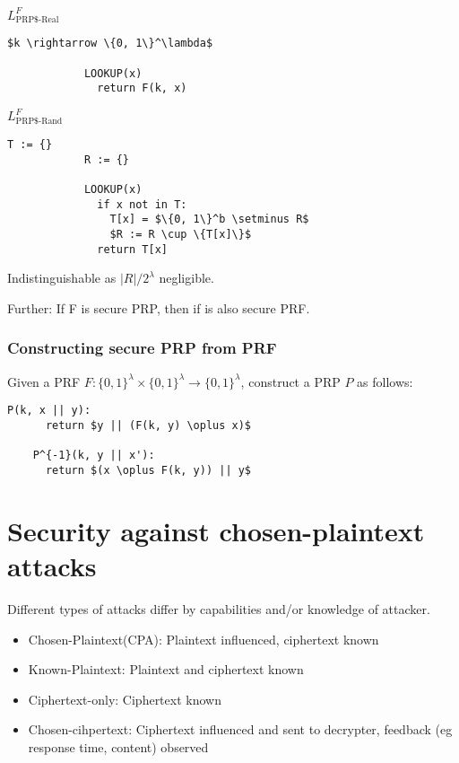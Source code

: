 \documentclass[a4paper]{scrreprt}
\begin{document}
\begin{tcbraster}[raster columns=2,raster equal height,nobeforeafter,raster column skip=2cm]
	\begin{library}{$L^F_{\text{PRP\$-Real}}$}
		\begin{lstlisting}[mathescape=true,autogobble=true]
			$k \rightarrow \{0, 1\}^\lambda$

			LOOKUP(x)
			  return F(k, x)
		\end{lstlisting}
	\end{library}
	\begin{library}{$L^F_{\text{PRP\$-Rand}}$}
		\begin{lstlisting}[mathescape=true,autogobble=true]
			T := {}
			R := {}

			LOOKUP(x)
			  if x not in T:
			    T[x] = $\{0, 1\}^b \setminus R$
			    $R := R \cup \{T[x]\}$
			  return T[x]
		\end{lstlisting}
	\end{library}
\end{tcbraster}

Indistinguishable as $|R| / 2^\lambda$ negligible.

Further: If F is secure PRP, then if is also secure PRF.

\subsection{Constructing secure PRP from PRF}

Given a PRF $F: \{0, 1\}^\lambda \times \{0, 1\}^\lambda \rightarrow \{0,
1\}^\lambda$, construct a PRP $P$ as follows:

\begin{lstlisting}[mathescape=true,autogobble=true]
	P(k, x || y):
	  return $y || (F(k, y) \oplus x)$

	P^{-1}(k, y || x'):
	  return $(x \oplus F(k, y)) || y$
\end{lstlisting}

\chapter{Security against chosen-plaintext attacks}

Different types of attacks differ by capabilities and/or knowledge of attacker.

\begin{itemize}
	\item Chosen-Plaintext(CPA): Plaintext influenced, ciphertext known
	\item Known-Plaintext: Plaintext and ciphertext known
	\item Ciphertext-only: Ciphertext known
	\item Chosen-cihpertext: Ciphertext influenced and sent to decrypter,
		feedback (eg response time, content) observed
\end{itemize}
\end{document}

